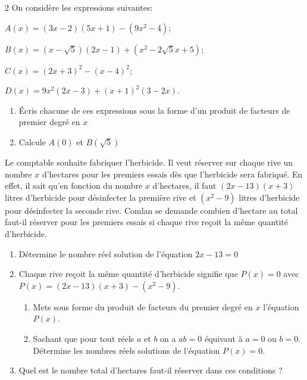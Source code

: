 \begin{multicols*}{2}
  	On considère les expressions suivantes:
  	
  	$A(x)=(3x-2)(5x+1)-(9x^2-4)$;
  	
  	$B(x)=(x-\sqrt{5})(2x-1)+(x^2-2\sqrt{5}x+5)$;
  	
  	$C(x)= (2x+3)^2-(x-4)^2$;
  	
  	$D(x)= 9x^2(2x-3)+(x+1)^2(3-2x)$.
  	\begin{enumerate}
  		\item Écris chacune de ces expressions sous la forme d'un produit de facteurs de premier degré en $x$
  		\item Calcule $A(0)$ et $B(\sqrt{5})$ 
  	\end{enumerate}
  	
  	\dures
 
  	\setcounter{q}{0}
  	
  	Le comptable souhaite fabriquer l'herbicide. Il veut réserver sur chaque rive un nombre $x$ d'hectares pour les premiers essais dès que l'herbicide sera fabriqué. En effet, il sait qu'en fonction du nombre $x$ d'hectares, il faut $(2x-13)(x+3)$ litres d'herbicide pour désinfecter la première rive et $\left(x^2-9\right)$ litres d'herbicide pour désinfecter la seconde rive. Comlan se demande combien d'hectare au total faut-il réserver pour les premiers essais si chaque rive reçoit la même quantité d'herbicide.
  	
  	
  	\begin{enumerate}
  		\item  Détermine le nombre réel solution de l'équation $2x-13=0$
  		\item Chaque rive reçoit la même quantité d'herbicide signifie que $P(x)=0$ avec $ P(x)=(2x-13)(x+3)-\left(x^2-9\right)$.
  		\begin{enumerate}
  			\item Mets sous forme du produit de facteurs du premier degré en $x$ l'équation $P(x)$.
  			\item Sachant que pour tout réels $a$ et $b$ on a $ab=0$ équivaut à $a=0$ ou $b=0$. Détermine les nombres réels solutions de l'équation $P(x)=0$.
  		\end{enumerate}
  		\item Quel est le nombre total d'hectares faut-il réserver dans ces conditions ?
  	\end{enumerate} 
  	

\end{multicols*}
